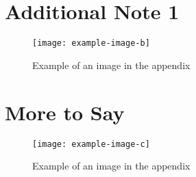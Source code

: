 \setcounter{figure}{0}
\setcounter{table}{0}
\pagestyle{appendix}
\appendix
{}
\renewcommand{\thesection}{\Alph{section}} %
\renewcommand{\thesubsection}{\Alph{subsection}} %
\renewcommand{\thefigure}{\Alph{section}.\arabic{figure}}
\renewcommand{\thetable}{\Alph{section}.\arabic{table}}


\section{Additional Note 1}
\lipsum[2]

\begin{figure}[H] %
    \centering
    \caption{Example of an image in the appendix}
    \texttt{[image: example-image-b]}
    \label{fig:appendix_a}
\end{figure}

\newpage
\setcounter{figure}{0}
\setcounter{table}{0}
\section{More to Say}

\lipsum[3]

\begin{figure}[H]
    \centering
    \caption{Example of an image in the appendix}
    \texttt{[image: example-image-c]}
    \label{fig:appendix_b}
\end{figure}